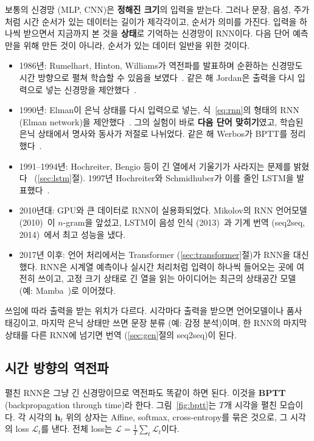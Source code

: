 \documentclass[11pt,a4paper]{article}
\newcommand{\figref}[1]{그림~\ref{fig:#1}}
\newcommand{\eqnref}[1]{식~\eqref{eq:#1}}
\newcommand{\vect}[1]{\bm{#1}}
\newcommand{\loss}{\mathcal{L}}
\begin{document}
\begin{remarkbox}
보통의 신경망 (MLP, CNN)은 \textbf{정해진 크기}의 입력을 받는다. 그러나 문장, 음성, 주가처럼 시간 순서가 있는 데이터는 길이가 제각각이고, 순서가 의미를 가진다.
입력을 하나씩 받으면서 지금까지 본 것을 \textbf{상태}로 기억하는 신경망이 RNN이다. 다음 단어 예측만을 위해 만든 것이 아니라, 순서가 있는 데이터 일반을 위한 것이다.
\begin{itemize}[leftmargin=1.2em]
\item 1986년: Rumelhart, Hinton, Williams가 역전파를 발표하며 순환하는 신경망도 시간 방향으로 펼쳐 학습할 수 있음을 보였다~\cite{rumelhart1986}. 같은 해 Jordan은 출력을 다시 입력으로 넣는 신경망을 제안했다~\cite{jordan1986}.
\item 1990년: Elman이 은닉 상태를 다시 입력으로 넣는, \eqnref{rnn}의 형태의 RNN (Elman network)을 제안했다~\cite{elman1990}. 그의 실험이 바로 \textbf{다음 단어 맞히기}였고, 학습된 은닉 상태에서 명사와 동사가 저절로 나뉘었다. 같은 해 Werbos가 BPTT를 정리했다~\cite{werbos1990}.
\item 1991--1994년: Hochreiter, Bengio 등이 긴 열에서 기울기가 사라지는 문제를 밝혔다~\cite{hochreiter1991,bengio1994} (\ref{sec:lstm}절). 1997년 Hochreiter와 Schmidhuber가 이를 줄인 LSTM을 발표했다~\cite{hochreiter1997}.
\item 2010년대: GPU와 큰 데이터로 RNN이 실용화되었다. Mikolov의 RNN 언어모델 (2010)~\cite{mikolov2010}이 $n$-gram을 앞섰고, LSTM이 음성 인식 (2013)~\cite{graves2013}과 기계 번역 (seq2seq, 2014)~\cite{sutskever2014}에서 최고 성능을 냈다.
\item 2017년 이후: 언어 처리에서는 Transformer (\ref{sec:transformer}절)가 RNN을 대신했다. RNN은 시계열 예측이나 실시간 처리처럼 입력이 하나씩 들어오는 곳에 여전히 쓰이고, 고정 크기 상태로 긴 열을 읽는 아이디어는 최근의 상태공간 모델 (예: Mamba~\cite{gu2023})로 이어졌다.
\end{itemize}
쓰임에 따라 출력을 받는 위치가 다르다. 시각마다 출력을 받으면 언어모델이나 품사 태깅이고, 마지막 은닉 상태만 쓰면 문장 분류 (예: 감정 분석)이며, 한 RNN의 마지막 상태를 다른 RNN에 넘기면 번역 (\ref{sec:gen}절의 seq2seq)이 된다.
\end{remarkbox}

\subsection{시간 방향의 역전파}

펼친 RNN은 그냥 긴 신경망이므로 역전파도 똑같이 하면 된다. 이것을 \textbf{BPTT} (backpropagation through time)라 한다.
\figref{bptt}는 $T$개 시각을 펼친 모습이다. 각 시각의 $\vect h_t$ 위의 상자는 Affine, softmax, cross-entropy를 묶은 것으로, 그 시각의 loss $\loss_t$를 낸다. 전체 loss는 $\loss=\frac1T\sum_t\loss_t$이다.
\end{document}
